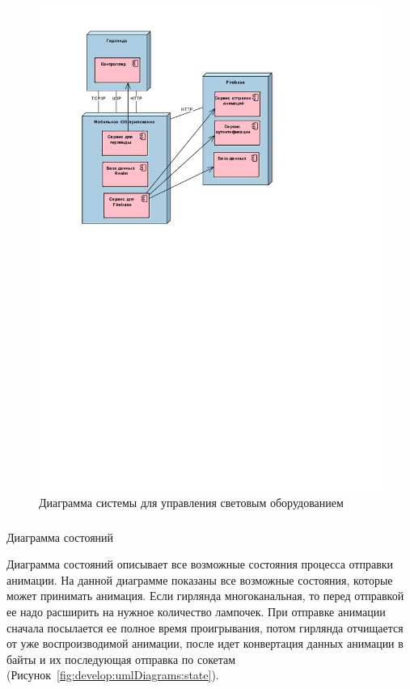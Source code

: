 ~
\begin{figure}[H]
\centering
	\includegraphics[scale=0.8]{figures/uml_deployment.pdf}
	\caption{Диаграмма системы для управления световым оборудованием}
	\label{fig:develop:umlDiagrams:deployment}
\end{figure}

\subsubsection{} Диаграмма состояний
\label{sec:develop:umlDiagrams:useCase}

Диаграмма состояний описывает все возможные состояния процесса отправки анимации. На данной диаграмме показаны все возможные состояния, которые может принимать анимация. Если гирлянда многоканальная, то перед отправкой ее надо расширить на нужное количество лампочек. При отправке анимации сначала посылается ее полное время проигрывания, потом гирлянда отчищается от уже воспроизводимой анимации, после идет конвертация данных анимации в байты и их последующая отправка по сокетам (Рисунок~\ref{fig:develop:umlDiagrams:state}).

